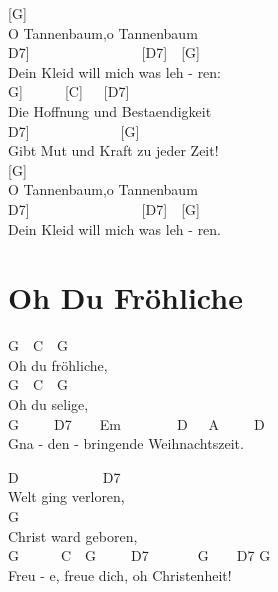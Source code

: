 \documentclass[
  letterpaper,
  a5paper]{memoir}
\begin{document}
{[}G{]}~~~~\\
O Tannenbaum,o Tannenbaum\\
\hspace*{0.333em}\hspace*{0.333em}\hspace*{0.333em}\hspace*{0.333em}{[}D7{]}~~~~~~~~~~~~~~~~{[}D7{]}~~{[}G{]}~~~~~\\
Dein Kleid will mich was leh - ren:\\
\hspace*{0.333em}\hspace*{0.333em}\hspace*{0.333em}{[}G{]}~~~~~~{[}C{]}~~~{[}D7{]}~~\\
Die Hoffnung und Bestaendigkeit\\
\hspace*{0.333em}\hspace*{0.333em}\hspace*{0.333em}\hspace*{0.333em}{[}D7{]}~~~~~~~~~~~~~{[}G{]}~~\\
Gibt Mut und Kraft zu jeder Zeit!\\
{[}G{]}~~\\
O Tannenbaum,o Tannenbaum\\
\hspace*{0.333em}\hspace*{0.333em}\hspace*{0.333em}\hspace*{0.333em}{[}D7{]}~~~~~~~~~~~~~~~~{[}D7{]}~~{[}G{]}~~~~~\\
Dein Kleid will mich was leh - ren.

\hypertarget{oh-du-fruxf6hliche}{%
\chapter{Oh Du Fröhliche}\label{oh-du-fruxf6hliche}}

G~~C~~G\\
Oh du fröhliche,\\
G~~C~~G\\
Oh du selige,\\
G~~~~~D7~~~~Em~~~~~~~~D~~~A~~~~~D\\
Gna - den - bringende Weihnachtszeit.

D~~~~~~~~~~~~D7\\
Welt ging verloren,\\
G\\
Christ ward geboren,\\
G~~~~~~C~~G~~~~~D7~~~~~~~G~~~~D7 G\\
Freu - e, freue dich, oh Christenheit!
\end{document}
